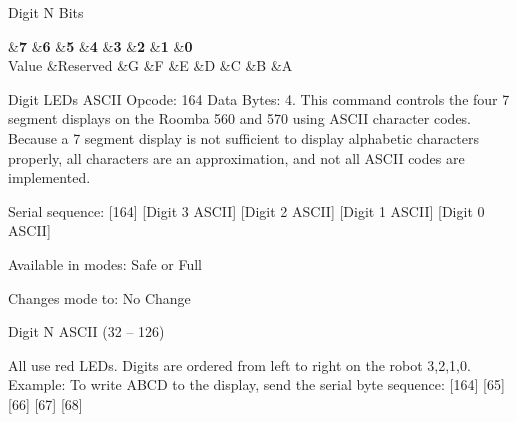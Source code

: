 \begin{Desc}
\begin{description}
Digit N Bits \begin{TabularC}{9}
\hline
{}&{\bf 7 }&{\bf 6 }&{\bf 5 }&{\bf 4 }&{\bf 3 }&{\bf 2 }&{\bf 1 }&{\bf 0  }\\
Value &Reserved &G &F &E &D &C &B &A \\
\end{TabularC}
\item[{\em 
\hypertarget{group__roomba-lib_gga305e17dfb7050ad83ea49ded2e6a2e24a094d22b24aae1379b33389cf701b5356}{}R\+O\+O\+M\+B\+A\+\_\+\+D\+I\+G\+I\+T\+\_\+\+L\+E\+D\+S\+\_\+\+A\+S\+C\+I\+I\label{group__roomba-lib_gga305e17dfb7050ad83ea49ded2e6a2e24a094d22b24aae1379b33389cf701b5356}
}]Digit L\+E\+Ds A\+S\+C\+I\+I Opcode\+: 164 Data Bytes\+: 4. This command controls the four 7 segment displays on the Roomba 560 and 570 using A\+S\+C\+I\+I character codes. Because a 7 segment display is not sufficient to display alphabetic characters properly, all characters are an approximation, and not all A\+S\+C\+I\+I codes are implemented.
\begin{DoxyItemize}
\item Serial sequence\+: \mbox{[}164\mbox{]} \mbox{[}Digit 3 A\+S\+C\+I\+I\mbox{]} \mbox{[}Digit 2 A\+S\+C\+I\+I\mbox{]} \mbox{[}Digit 1 A\+S\+C\+I\+I\mbox{]} \mbox{[}Digit 0 A\+S\+C\+I\+I\mbox{]}
\item Available in modes\+: Safe or Full
\item Changes mode to\+: No Change
\item Digit N A\+S\+C\+I\+I (32 – 126)
\item All use red L\+E\+Ds. Digits are ordered from left to right on the robot 3,2,1,0. Example\+: To write A\+B\+C\+D to the display, send the serial byte sequence\+: \mbox{[}164\mbox{]} \mbox{[}65\mbox{]} \mbox{[}66\mbox{]} \mbox{[}67\mbox{]} \mbox{[}68\mbox{]}
\end{DoxyItemize}


\end{description}
\end{Desc}
